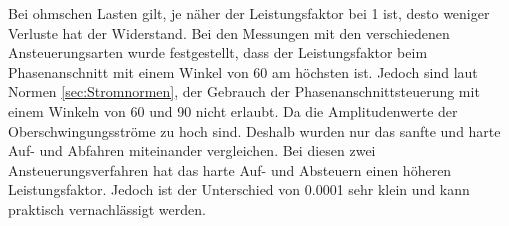 Bei ohmschen Lasten gilt, je näher der Leistungsfaktor bei 1 ist, desto weniger Verluste hat der Widerstand. Bei den Messungen mit den verschiedenen Ansteuerungsarten wurde festgestellt, dass der Leistungsfaktor beim Phasenanschnitt mit einem Winkel von 60\textdegree \hspace{0.02cm} am höchsten ist. Jedoch sind laut Normen \ref{sec:Stromnormen}, der Gebrauch der Phasenanschnittsteuerung mit einem Winkeln von 60\textdegree \hspace{0.02cm} und 90\textdegree \hspace{0.02cm} nicht erlaubt. Da die Amplitudenwerte der Oberschwingungsströme zu hoch sind. Deshalb wurden nur das sanfte und harte Auf- und Abfahren miteinander vergleichen. Bei diesen zwei Ansteuerungsverfahren hat das harte Auf- und Absteuern einen höheren Leistungsfaktor. Jedoch ist der Unterschied von 0.0001 sehr klein und kann praktisch vernachlässigt werden.
 



